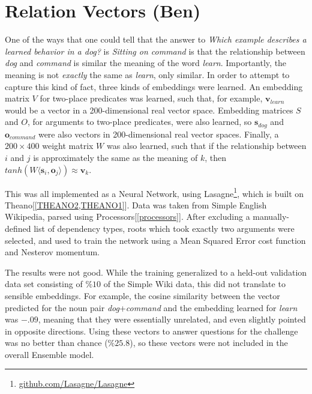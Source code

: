 \section{Relation Vectors (Ben)}

	One of the ways that one could tell that the answer to \textit{Which example describes a learned behavior in a dog?} is \textit{Sitting on command} is that the relationship between \textit{dog} and \textit{command} is similar the meaning of the word \textit{learn}. Importantly, the meaning is not \emph{exactly} the same as \textit{learn}, only similar. In order to attempt to capture this kind of fact, three kinds of embeddings were learned. An embedding matrix $V$ for two-place predicates was learned, such that, for example, $\mathbf{v}_{learn}$ would be a vector in a 200-dimensional real vector space. Embedding matrices $S$ and $O$, for arguments to two-place predicates, were also learned, so $\mathbf{s}_{dog}$ and $\mathbf{o}_{command}$ were also vectors in 200-dimensional real vector spaces. Finally, a $200\times 400$ weight matrix $W$ was also learned, such that if the relationship between $i$ and $j$ is approximately the same as the meaning of $k$, then $tanh(W \langle \mathbf{s}_{i} , \mathbf{o}_{j} \rangle) \approx \mathbf{v}_{k}$. 
    
    This was all implemented as a Neural Network, using Lasagne\footnote{\url{github.com/Lasagne/Lasagne}}, which is built on Theano[\ref{THEANO2,THEANO1}]. Data was taken from Simple English Wikipedia, parsed using Processors[\ref{processors}]. After excluding a manually-defined list of dependency types, roots which took exactly two arguments were selected, and used to train the network using a Mean Squared Error cost function and Nesterov momentum.
    
   	The results were not good. While the training generalized to a held-out validation data set consisting of $\%10$ of the Simple Wiki data, this did not translate to sensible embeddings. For example, the cosine similarity between the vector predicted for the noun pair \textit{dog}+\textit{command} and the embedding learned for \textit{learn} was $-.09$, meaning that they were essentially unrelated, and even slightly pointed in opposite directions. Using these vectors to answer questions for the challenge was no better than chance ($\%25.8$), so these vectors were not included in the overall Ensemble model.